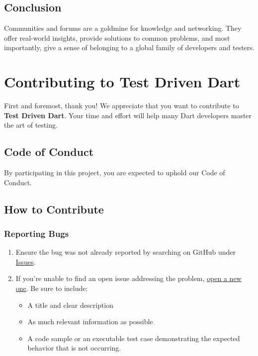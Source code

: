 \documentclass[
]{article}
\providecommand{\tightlist}{%
  \setlength{\itemsep}{0pt}\setlength{\parskip}{0pt}}
\begin{document}
\subsection{Conclusion}\label{conclusion-19}

Communities and forums are a goldmine for knowledge and networking. They
offer real-world insights, provide solutions to common problems, and
most importantly, give a sense of belonging to a global family of
developers and testers.

\section{Contributing to Test Driven
Dart}\label{contributing-to-test-driven-dart}

First and foremost, thank you! We appreciate that you want to contribute
to \textbf{Test Driven Dart}. Your time and effort will help many Dart
developers master the art of testing.

\subsection{Code of Conduct}\label{code-of-conduct}

By participating in this project, you are expected to uphold our Code of
Conduct.

\subsection{How to Contribute}\label{how-to-contribute-1}

\subsubsection{Reporting Bugs}\label{reporting-bugs}

\begin{enumerate}
\def\labelenumi{\arabic{enumi}.}
\tightlist
\item
  Ensure the bug was not already reported by searching on GitHub under
  \href{https://github.com/YOUR_USERNAME/test-driven-dart/issues}{Issues}.
\item
  If you're unable to find an open issue addressing the problem,
  \href{https://github.com/YOUR_USERNAME/test-driven-dart/issues/new}{open
  a new one}. Be sure to include:

  \begin{itemize}
  \tightlist
  \item
    A title and clear description
  \item
    As much relevant information as possible
  \item
    A code sample or an executable test case demonstrating the expected
    behavior that is not occurring.
  \end{itemize}
\end{enumerate}
\end{document}
